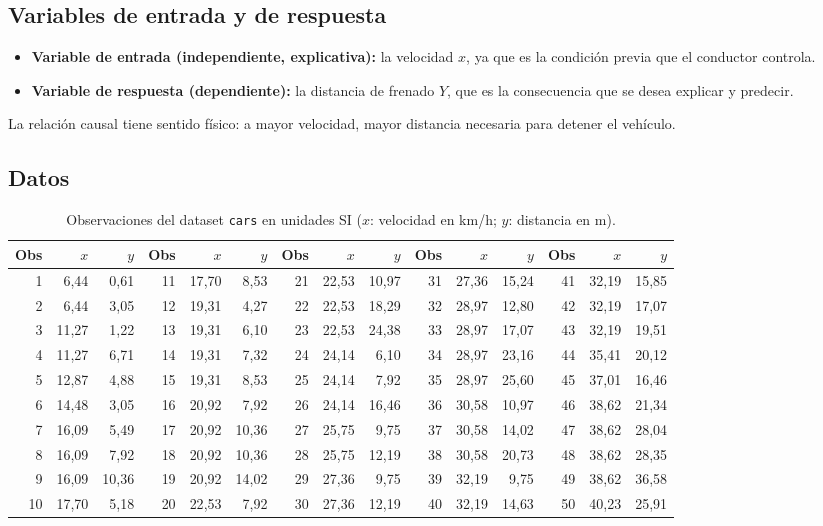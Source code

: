 \documentclass[12pt,a4paper]{article}
\begin{document}
\subsection{Variables de entrada y de respuesta}

\begin{itemize}[leftmargin=*]
  \item \textbf{Variable de entrada (independiente, explicativa):} la velocidad $x$, ya que es la condición previa que el conductor controla.
  \item \textbf{Variable de respuesta (dependiente):} la distancia de frenado $Y$, que es la consecuencia que se desea explicar y predecir.
\end{itemize}

La relación causal tiene sentido físico: a mayor velocidad, mayor distancia necesaria para detener el vehículo.

\subsection{Datos}

\begin{table}[H]
\centering
\caption{Observaciones del dataset \texttt{cars} en unidades SI ($x$: velocidad en km/h; $y$: distancia en m).}
\footnotesize
\setlength{\tabcolsep}{3.5pt}
\begin{tabular}{rrr|rrr|rrr|rrr|rrr}
\toprule
Obs & $x$ & $y$ & Obs & $x$ & $y$ & Obs & $x$ & $y$ & Obs & $x$ & $y$ & Obs & $x$ & $y$ \\
\midrule
1 & 6{,}44 & 0{,}61 & 11 & 17{,}70 & 8{,}53 & 21 & 22{,}53 & 10{,}97 & 31 & 27{,}36 & 15{,}24 & 41 & 32{,}19 & 15{,}85 \\
2 & 6{,}44 & 3{,}05 & 12 & 19{,}31 & 4{,}27 & 22 & 22{,}53 & 18{,}29 & 32 & 28{,}97 & 12{,}80 & 42 & 32{,}19 & 17{,}07 \\
3 & 11{,}27 & 1{,}22 & 13 & 19{,}31 & 6{,}10 & 23 & 22{,}53 & 24{,}38 & 33 & 28{,}97 & 17{,}07 & 43 & 32{,}19 & 19{,}51 \\
4 & 11{,}27 & 6{,}71 & 14 & 19{,}31 & 7{,}32 & 24 & 24{,}14 & 6{,}10 & 34 & 28{,}97 & 23{,}16 & 44 & 35{,}41 & 20{,}12 \\
5 & 12{,}87 & 4{,}88 & 15 & 19{,}31 & 8{,}53 & 25 & 24{,}14 & 7{,}92 & 35 & 28{,}97 & 25{,}60 & 45 & 37{,}01 & 16{,}46 \\
6 & 14{,}48 & 3{,}05 & 16 & 20{,}92 & 7{,}92 & 26 & 24{,}14 & 16{,}46 & 36 & 30{,}58 & 10{,}97 & 46 & 38{,}62 & 21{,}34 \\
7 & 16{,}09 & 5{,}49 & 17 & 20{,}92 & 10{,}36 & 27 & 25{,}75 & 9{,}75 & 37 & 30{,}58 & 14{,}02 & 47 & 38{,}62 & 28{,}04 \\
8 & 16{,}09 & 7{,}92 & 18 & 20{,}92 & 10{,}36 & 28 & 25{,}75 & 12{,}19 & 38 & 30{,}58 & 20{,}73 & 48 & 38{,}62 & 28{,}35 \\
9 & 16{,}09 & 10{,}36 & 19 & 20{,}92 & 14{,}02 & 29 & 27{,}36 & 9{,}75 & 39 & 32{,}19 & 9{,}75 & 49 & 38{,}62 & 36{,}58 \\
10 & 17{,}70 & 5{,}18 & 20 & 22{,}53 & 7{,}92 & 30 & 27{,}36 & 12{,}19 & 40 & 32{,}19 & 14{,}63 & 50 & 40{,}23 & 25{,}91 \\
\bottomrule
\end{tabular}
\end{table}
\end{document}
